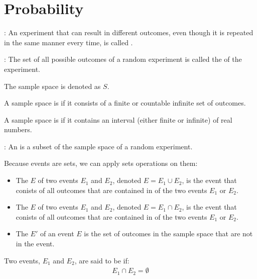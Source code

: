 \chapter{Probability}

    \par {}: An experiment that can result in different outcomes,
      even though it is repeated in the same manner every time, is called
      .

      \par {}: The set of all possible outcomes of a random
        experiment is called the  of the experiment.
        \par The sample space is denoted as $S$.

      \par A sample space is  if it consists of a finite or
        countable infinite set of outcomes.
      \par A sample space is  if it contains an interval (either
        finite or infinite) of real numbers.

      \par {}: An  is a subset of the sample space of a
        random experiment.

      \par Because events are sets, we can apply sets operations on them:
      \begin{itemize}
        \item The  $E$ of two events $E_1$ and $E_2$, denoted $E =
          E_1 \cup E_2$, is the event that conists of all outcomes that are
          contained in  of the two events $E_1$ or $E_2$.
        \item The  $E$ of two events $E_1$ and $E_2$, denoted
          $E = E_1 \cap E_2$, is the event that conists of all outcomes that
          are contained in  of the two events $E_1$ or $E_2$.
        \item The  $E'$ of an event $E$ 
          is the set of outcomes in the sample space that are not in the event.
      \end{itemize}

      \par Two events, $E_1$ and $E_2$, are said to be 
        if:
        \begin{align*}
          E_1 \cap E_2 = \emptyset
        \end{align*}

